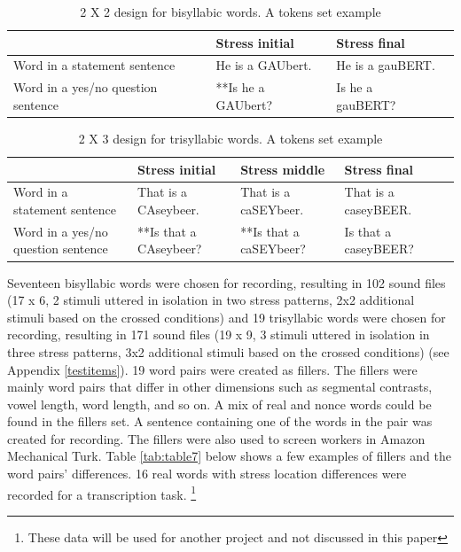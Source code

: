 \documentclass[a4paper]{article}
\begin{document}
\begin{table}[H]
  \begin{center}
    \caption{2 X 2 design for bisyllabic words. A tokens set example}
    \label{tab:table5}
      \begin{tabular}{|p{5cm}|p{4cm}|p{4cm}|p{4cm}}
      \hline
       & Stress initial & Stress final \\
      \hline
      Word in a statement sentence & He is a GAUbert. & He is a gauBERT. \\
      \hline
      Word in a yes/no question sentence & **Is he a GAUbert? & Is he a gauBERT? \\
      \hline
    \end{tabular}
  \end{center}
\end{table}


\begin{table}[H]
  \begin{center}
    \caption{2 X 3 design for trisyllabic words. A tokens set example}
    \label{tab:table6}
      \begin{tabular}{|p{4cm}|p{3cm}|p{3cm}|p{3cm}|p{3cm}}
      \hline
       & Stress initial & Stress middle & Stress final \\
      \hline
      Word in a statement sentence & That is a CAseybeer. & That is a caSEYbeer. & That is a caseyBEER. \\
      \hline
      Word in a yes/no question sentence & **Is that a CAseybeer? & **Is that a caSEYbeer? & Is that a caseyBEER? \\
      \hline
    \end{tabular}
  \end{center}
\end{table}

Seventeen bisyllabic words were chosen for recording, resulting in 102 sound files (17 x 6, 2 stimuli uttered in isolation in two stress patterns, 2x2 additional stimuli based on the crossed conditions) and 19 trisyllabic words were chosen for recording, resulting in 171 sound files (19 x 9, 3 stimuli uttered in isolation in three stress patterns, 3x2 additional stimuli based on the crossed conditions) (see Appendix \ref{testitems}). 19 word pairs were created as fillers. The fillers were mainly word pairs that differ in other dimensions such as segmental contrasts, vowel length, word length, and so on. A mix of real and nonce words could be found in the fillers set. A sentence containing one of the words in the pair was created for recording. The fillers were also used to screen workers in Amazon Mechanical Turk. Table \ref{tab:table7} below shows a few examples of fillers and the word pairs' differences. 16 real words with stress location differences were recorded for a transcription task. \footnote{These data will be used for another project and not discussed in this paper}
\end{document}
